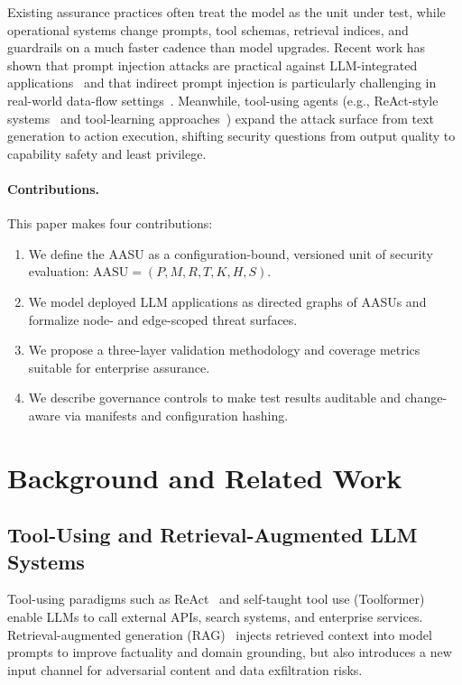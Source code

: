 \documentclass[11pt]{article}
\newcommand{\AASU}{\textsc{AASU}}
\newcommand{\AASUs}{\AASU{}s}
\newcommand{\AASUm}{\mathrm{AASU}}
\begin{document}
Existing assurance practices often treat the model as the unit under test, while operational systems
change prompts, tool schemas, retrieval indices, and guardrails on a much faster cadence than model upgrades.
Recent work has shown that prompt injection attacks are practical against LLM-integrated applications~\cite{DBLP:journals/corr/abs-2306-05499}
and that indirect prompt injection is particularly challenging in real-world data-flow settings~\cite{DBLP:journals/corr/abs-2312-14197}.
Meanwhile, tool-using agents (e.g., ReAct-style systems~\cite{DBLP:journals/corr/abs-2210-03629} and tool-learning approaches~\cite{DBLP:journals/corr/abs-2302-04761})
expand the attack surface from text generation to action execution, shifting security questions from output quality to
capability safety and least privilege.

\paragraph{Contributions.}
This paper makes four contributions:
\begin{enumerate}[leftmargin=*,itemsep=2pt]
  \item We define the \AASU{} as a configuration-bound, versioned unit of security evaluation: $\AASUm = (P,M,R,T,K,H,S)$.
  \item We model deployed LLM applications as directed graphs of \AASUs{} and formalize node- and edge-scoped threat surfaces.
  \item We propose a three-layer validation methodology and coverage metrics suitable for enterprise assurance.
  \item We describe governance controls to make test results auditable and change-aware via manifests and configuration hashing.
\end{enumerate}

\section{Background and Related Work}
\subsection{Tool-Using and Retrieval-Augmented LLM Systems}
Tool-using paradigms such as ReAct~\cite{DBLP:journals/corr/abs-2210-03629} and self-taught tool use (Toolformer)~\cite{DBLP:journals/corr/abs-2302-04761}
enable LLMs to call external APIs, search systems, and enterprise services.
Retrieval-augmented generation (RAG)~\cite{DBLP:journals/corr/abs-2005-11401} injects retrieved context into model prompts to improve factuality and domain grounding,
but also introduces a new input channel for adversarial content and data exfiltration risks.
\end{document}
